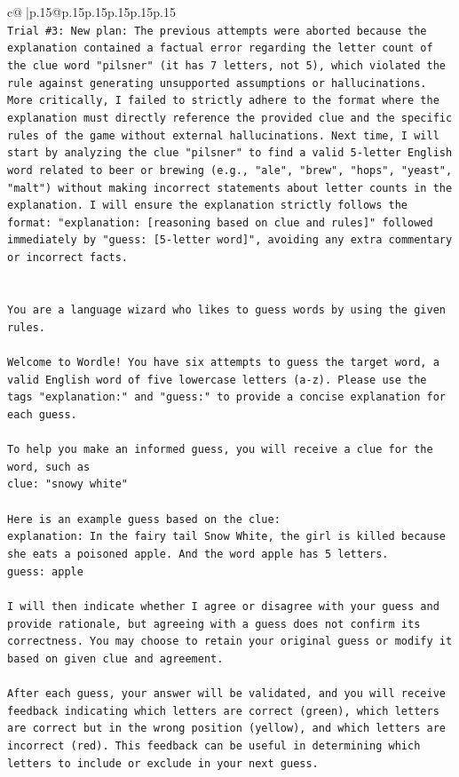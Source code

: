 \documentclass{article}
\begin{document}
{\begin{supertabular}{c@{$\;$}|p{.15\linewidth}@{}p{.15\linewidth}p{.15\linewidth}p{.15\linewidth}p{.15\linewidth}p{.15\linewidth}}
{{{\\ 
\texttt{Trial \#3: New plan: The previous attempts were aborted because the explanation contained a factual error regarding the letter count of the clue word "pilsner" (it has 7 letters, not 5), which violated the rule against generating unsupported assumptions or hallucinations. More critically, I failed to strictly adhere to the format where the explanation must directly reference the provided clue and the specific rules of the game without external hallucinations. Next time, I will start by analyzing the clue "pilsner" to find a valid 5{-}letter English word related to beer or brewing (e.g., "ale", "brew", "hops", "yeast", "malt") without making incorrect statements about letter counts in the explanation. I will ensure the explanation strictly follows the format: "explanation: {[}reasoning based on clue and rules{]}" followed immediately by "guess: {[}5{-}letter word{]}", avoiding any extra commentary or incorrect facts.} \\
\\ 
\\ 
\texttt{You are a language wizard who likes to guess words by using the given rules.} \\
\\ 
\texttt{Welcome to Wordle! You have six attempts to guess the target word, a valid English word of five lowercase letters (a{-}z). Please use the tags "explanation:" and "guess:" to provide a concise explanation for each guess.} \\
\\ 
\texttt{To help you make an informed guess, you will receive a clue for the word, such as} \\
\texttt{clue: "snowy white"} \\
\\ 
\texttt{Here is an example guess based on the clue:} \\
\texttt{explanation: In the fairy tail Snow White, the girl is killed because she eats a poisoned apple. And the word apple has 5 letters.} \\
\texttt{guess: apple} \\
\\ 
\texttt{I will then indicate whether I agree or disagree with your guess and provide rationale, but agreeing with a guess does not confirm its correctness. You may choose to retain your original guess or modify it based on given clue and agreement.} \\
\\ 
\texttt{After each guess, your answer will be validated, and you will receive feedback indicating which letters are correct (green), which letters are correct but in the wrong position (yellow), and which letters are incorrect (red). This feedback can be useful in determining which letters to include or exclude in your next guess.} \\
}}}
\end{supertabular}}
\end{document}
